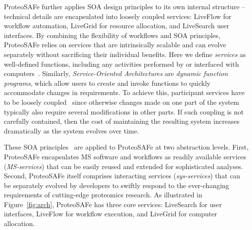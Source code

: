 \documentclass[arial,11pt]{article}
\newcommand{\SF}[1]{\textsf{#1}}
\newcommand{\SYSTEM}[0]{\SF{ProteoSAFe}\xspace}
\newcommand{\LiveSearch}[0]{\SF{LiveSearch}\xspace}
\newcommand{\LiveFlow}[0]{\SF{LiveFlow}\xspace}
\newcommand{\LiveGrid}[0]{\SF{LiveGrid}\xspace}
\begin{document}
\SYSTEM further applies SOA design principles to its own internal structure -- technical details are encapsulated into loosely coupled services: \LiveFlow for workflow automation, \LiveGrid for resource allocation, and \LiveSearch user interfaces. By combining the flexibility of workflows and SOA principles, \SYSTEM relies on services that are intrinsically scalable and can evolve separately without sacrificing their individual benefits.
%
Here we define {\em services} as well-defined functions, including any activities performed by or interfaced with computers~\cite{Broy:2007}. Similarly, {\em  Service-Oriented Architectures} are {\em  dynamic function programs}, which allow users to create and invoke functions to quickly accommodate changes in requirements. To achieve this, participant services have to be loosely coupled~\cite{Broy:2007} since otherwise changes made on one part of the system typically also require several modifications in other parts. If such coupling is not carefully contained, then the cost of maintaining the resulting system increases dramatically as the system evolves over time.

These SOA principles~\cite{Arrott:2007,Ermagan:2007} are applied to \SYSTEM at two abstraction levels. First, \SYSTEM encapsulates MS  software and workflows as readily available services ({\em  MS-services}) that can be easily reused and extended for sophisticated analyses. %
Second, \SYSTEM itself comprises interacting services ({\em  sys-services}) that can be separately evolved by developers to swiftly respond to the ever-changing requirements of cutting-edge proteomics research. As illustrated in Figure~\ref{fig:arch}, \SYSTEM has three core services: \LiveSearch for user interfaces, \LiveFlow for workflow execution, and \LiveGrid for computer allocation.
\end{document}
